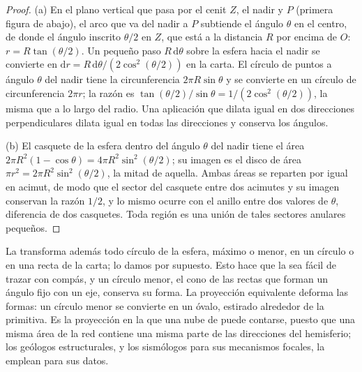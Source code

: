 \begin{proof}
(a) En el plano vertical que pasa por el cenit $Z$, el nadir y $P$
(primera figura de abajo), el arco que va del nadir a $P$
subtiende el ángulo $\theta$ en el centro, de donde el ángulo inscrito
$\theta/2$ en $Z$, que está a la distancia $R$ por encima de $O$: $r =
R\tan(\theta/2)$. Un pequeño paso $R\,\mathrm d\theta$ sobre la esfera hacia el
nadir se convierte en $\mathrm dr = R\,\mathrm d\theta/(2\cos^2(\theta/2))$ en la
carta. El círculo de puntos a ángulo $\theta$ del nadir tiene la
circunferencia $2\pi R\sin\theta$ y se convierte en un círculo de circunferencia $2\pi
r$; la razón es $\tan(\theta/2)/\sin\theta = 1/(2\cos^2(\theta/2))$, la misma
que a lo largo del radio. Una aplicación que dilata igual en dos direcciones perpendiculares
dilata igual en todas las direcciones y conserva los ángulos.

(b) El casquete de la esfera dentro del ángulo $\theta$ del nadir tiene el área
$2\pi R^2(1 - \cos\theta) = 4\pi R^2\sin^2(\theta/2)$; su imagen es el disco
de área $\pi r^2 = 2\pi R^2\sin^2(\theta/2)$, la mitad de aquella. Ambas áreas se
reparten por igual en acimut, de modo que el sector del casquete entre dos acimutes
y su imagen conservan la razón $1/2$, y lo mismo ocurre con el anillo entre dos valores
de $\theta$, diferencia de dos casquetes. Toda región es una unión de tales
sectores anulares pequeños.
\end{proof}

La  transforma además todo círculo de la esfera, máximo o
menor, en un círculo o en una recta de la carta; lo damos por supuesto. Esto hace que la
 sea fácil de trazar con compás, y un círculo menor, el cono de las rectas que
forman un ángulo fijo con un eje, conserva su forma. La proyección equivalente
deforma las formas: un círculo menor se convierte en un óvalo, estirado
alrededor de la primitiva. Es la proyección en la que una nube de  puede
contarse, puesto que una misma área de la red contiene una misma parte de las
direcciones del hemisferio; los geólogos estructurales, y los sismólogos para sus
mecanismos focales, la emplean para sus datos.

